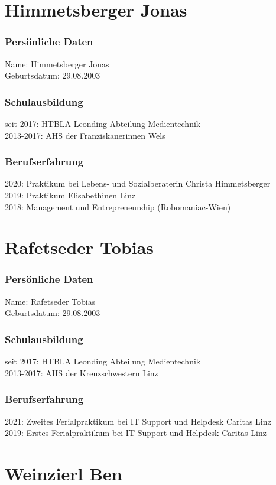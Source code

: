 
\section{Himmetsberger Jonas}
\subsubsection{Persönliche Daten}
Name: Himmetsberger Jonas \\
Geburtsdatum: 29.08.2003
\subsubsection{Schulausbildung}
seit 2017: HTBLA Leonding Abteilung Medientechnik \\
2013-2017: AHS der Franziskanerinnen Wels
\subsubsection{Berufserfahrung}
2020: Praktikum bei Lebens- und Sozialberaterin Christa Himmetsberger \\
2019: Praktikum Elisabethinen Linz \\
2018: Management und Entrepreneurship (Robomaniac-Wien)
\section{Rafetseder Tobias}
\subsubsection{Persönliche Daten}
Name: Rafetseder Tobias \\
Geburtsdatum: 29.08.2003
\subsubsection{Schulausbildung}
seit 2017: HTBLA Leonding Abteilung Medientechnik \\
2013-2017: AHS der Kreuzschwestern Linz
\subsubsection{Berufserfahrung}
2021: Zweites Ferialpraktikum bei IT Support und Helpdesk Caritas Linz \\
2019: Erstes Ferialpraktikum bei IT Support und Helpdesk Caritas Linz
\section{Weinzierl Ben}
